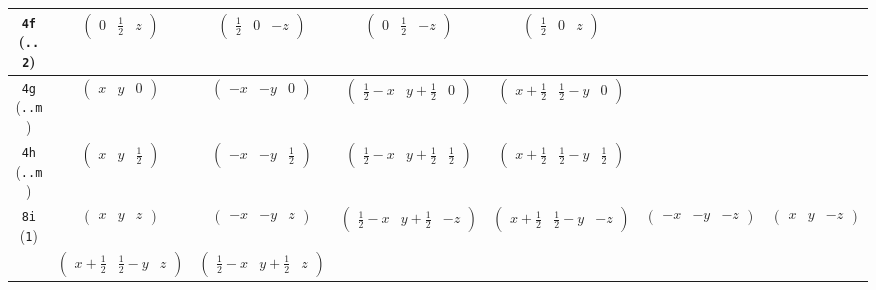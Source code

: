 \documentclass[fleqn,9pt,landscape]{jsarticle}
\begin{document}
\begin{center}
\begin{longtable}{ccccccc}
{\tt 4f} ({\tt ..2}) & $ \begin{pmatrix} 0 & \frac{1}{2} & z \end{pmatrix} $ & $ \begin{pmatrix} \frac{1}{2} & 0 & - z \end{pmatrix} $ & $ \begin{pmatrix} 0 & \frac{1}{2} & - z \end{pmatrix} $ & $ \begin{pmatrix} \frac{1}{2} & 0 & z \end{pmatrix} $ & $  $ & $  $ \\ \hline
{\tt 4g} ({\tt ..m}) & $ \begin{pmatrix} x & y & 0 \end{pmatrix} $ & $ \begin{pmatrix} - x & - y & 0 \end{pmatrix} $ & $ \begin{pmatrix} \frac{1}{2} - x & y + \frac{1}{2} & 0 \end{pmatrix} $ & $ \begin{pmatrix} x + \frac{1}{2} & \frac{1}{2} - y & 0 \end{pmatrix} $ & $  $ & $  $ \\ \hline
{\tt 4h} ({\tt ..m}) & $ \begin{pmatrix} x & y & \frac{1}{2} \end{pmatrix} $ & $ \begin{pmatrix} - x & - y & \frac{1}{2} \end{pmatrix} $ & $ \begin{pmatrix} \frac{1}{2} - x & y + \frac{1}{2} & \frac{1}{2} \end{pmatrix} $ & $ \begin{pmatrix} x + \frac{1}{2} & \frac{1}{2} - y & \frac{1}{2} \end{pmatrix} $ & $  $ & $  $ \\ \hline
{\tt 8i} ({\tt 1}) & $ \begin{pmatrix} x & y & z \end{pmatrix} $ & $ \begin{pmatrix} - x & - y & z \end{pmatrix} $ & $ \begin{pmatrix} \frac{1}{2} - x & y + \frac{1}{2} & - z \end{pmatrix} $ & $ \begin{pmatrix} x + \frac{1}{2} & \frac{1}{2} - y & - z \end{pmatrix} $ & $ \begin{pmatrix} - x & - y & - z \end{pmatrix} $ & $ \begin{pmatrix} x & y & - z \end{pmatrix} $ \\
& $ \begin{pmatrix} x + \frac{1}{2} & \frac{1}{2} - y & z \end{pmatrix} $ & $ \begin{pmatrix} \frac{1}{2} - x & y + \frac{1}{2} & z \end{pmatrix} $ & $  $ & $  $ & $  $ & $  $ \\
\end{longtable}
\end{center}
\end{document}
